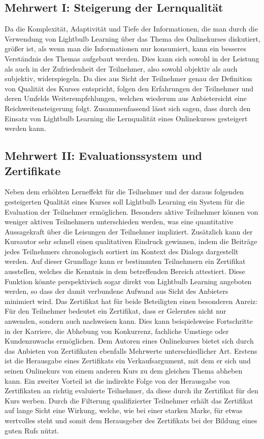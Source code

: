 \subsection{Mehrwert I: Steigerung der Lernqualität}
Da die Komplexität, Adaptivität und Tiefe der Informationen, die man durch die Verwendung von Lightbulb Learning über das Thema des Onlinekurses diskutiert, größer ist, als wenn man die Informationen nur konsumiert, kann ein besseres Verständnis des Themas aufgebaut werden. Dies kann sich sowohl in der Leistung als auch in der Zufriedenheit der Teilnehmer, also sowohl objektiv als auch subjektiv, widerspiegeln. Da dies aus Sicht der Teilnehmer genau der Definition von Qualität des Kurses entspricht, folgen den Erfahrungen der Teilnehmer und deren Umfelds Weiterempfehlungen, welchen wiederum aus Anbietersicht eine Reichweitensteigerung folgt. Zusammenfassend lässt sich sagen, dass durch den Einsatz von Lightbulb Learning die Lernqualität eines Onlinekurses gesteigert werden kann.

\subsection{Mehrwert II: Evaluationssystem und Zertifikate}
\label{sub:certs}
Neben dem erhöhten Lerneffekt für die Teilnehmer und der daraus folgenden gesteigerten Qualität eines Kurses soll Lightbulb Learning ein System für die Evaluation der Teilnehmer ermöglichen. Besonders aktive Teilnehmer können von weniger aktiven Teilnehmern unterschieden werden, was eine quantitative Aussagekraft über die Leisungen der Teilnehmer impliziert. Zusätzlich kann der Kursautor sehr schnell einen qualitativen Eindruck gewinnen, indem die Beiträge jedes Teilnehmers chronologisch sortiert im Kontext des Dialogs dargestellt werden. Auf dieser Grundlage kann er bestimmten Teilnehmern ein Zertifikat ausstellen, welches die Kenntnis in dem betreffenden Bereich attestiert. Diese Funktion könnte perspektivisch sogar direkt von Lightbulb Learning angeboten werden, so dass der damit verbundene Aufwand aus Sicht des Anbieters minimiert wird. Das Zertifikat hat für beide Beteiligten einen besonderen Anreiz: Für den Teilnehmer bedeutet ein Zertifikat, dass er Gelerntes nicht nur anwenden, sondern auch nachweisen kann. Dies kann beispielsweise Fortschritte in der Karriere, die Abhebung von Konkurrenz, fachliche Umstiege oder Kundenzuwachs ermöglichen. Dem Autoren eines Onlinekurses bietet sich durch das Anbieten von Zertifikaten ebenfalls Mehrwerte unterschiedlicher Art. Erstens ist die Herausgabe eines Zertifikats ein Verkaufsargument, mit dem er sich und seinen Onlinekurs von einem anderen Kurs zu dem gleichen Thema abheben kann. Ein zweiter Vorteil ist die indirekte Folge von der Herausgabe von Zertifikaten an richtig evaluierte Teilnehmer, da diese durch ihr Zertifikat für den Kurs werben. Durch die Filterung qualifizierter Teilnehmer erhält das Zertifikat auf lange Sicht eine Wirkung, welche, wie bei einer starken Marke, für etwas wertvolles steht und somit dem Herausgeber des Zertifikats bei der Bildung eines guten Rufs nützt.

